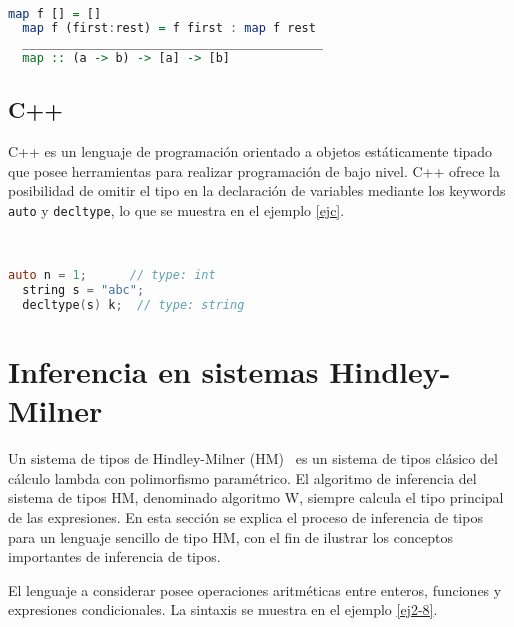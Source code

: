 \begin{ej} \ \\
  \normalfont
  \label{haskellpoly}
\begin{lstlisting}[language=Haskell]
  map f [] = []
  map f (first:rest) = f first : map f rest
  __________________________________________
  map :: (a -> b) -> [a] -> [b]
\end{lstlisting}
\end{ej}


\subsection{C++}
C++ es un lenguaje de programación orientado a objetos estáticamente tipado que posee herramientas para realizar programación de bajo nivel. C++ ofrece la posibilidad de omitir el tipo en la declaración de variables mediante los keywords \texttt{auto} y \texttt{decltype}, lo que se muestra en el ejemplo \ref{ejc}.

\begin{ej} \ \\
  \normalfont
  \label{ejc}
\begin{lstlisting}[language=C,morekeywords={decltype,string}]
  auto n = 1;      // type: int
  string s = "abc";
  decltype(s) k;  // type: string
\end{lstlisting}
\end{ej}

\section{Inferencia en sistemas Hindley-Milner} \label{sechm}

Un sistema de tipos de Hindley-Milner (HM)~\cite{damasmilner} es un sistema de tipos clásico del cálculo lambda con polimorfismo paramétrico. El algoritmo de inferencia del sistema de tipos HM, denominado algoritmo W, siempre calcula el tipo principal de las expresiones. En esta sección se explica el proceso de inferencia de tipos para un lenguaje sencillo de tipo HM, con el fin de ilustrar los conceptos importantes de inferencia de tipos.

El lenguaje a considerar posee operaciones aritméticas entre enteros, funciones y expresiones condicionales. La sintaxis se muestra en el ejemplo \ref{ej2-8}.

